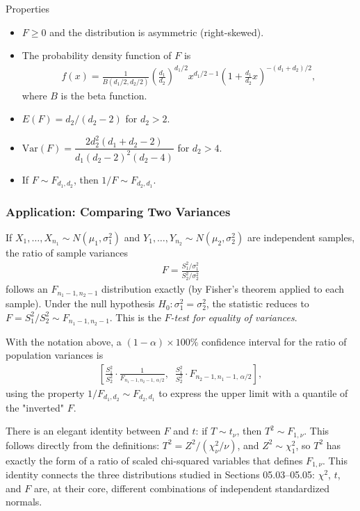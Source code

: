 {Properties}
\begin{itemize}
 \item $F \geq 0$ and the distribution is asymmetric (right-skewed).
 \item The probability density function of $F$ is
 \begin{align}
  \label{eq:3.2.16}
  f(x) = \frac{1}{B(d_1/2, d_2/2)} \left(\frac{d_1}{d_2}\right)^{d_1/2}
  x^{d_1/2 - 1} \left(1 + \frac{d_1}{d_2}x\right)^{-(d_1+d_2)/2},
  \end{align}
  where $B$ is the beta function.
 \item $E(F) = d_2/(d_2 - 2)$ for $d_2 > 2$.
 \item $\text{Var}(F) = \dfrac{2 d_2^2 (d_1 + d_2 - 2)}{d_1 (d_2 - 2)^2 (d_2 - 4)}$ for $d_2 > 4$.
 \item If $F \sim F_{d_1, d_2}$, then $1/F \sim F_{d_2, d_1}$.
\end{itemize}

\subsubsection{Application: Comparing Two Variances}

If $X_1, \ldots, X_{n_1} \sim N(\mu_1, \sigma_1^2)$ and $Y_1, \ldots, Y_{n_2} \sim N(\mu_2, \sigma_2^2)$ are independent samples, the ratio of sample variances
\begin{align}
 \label{eq:3.2.17}
 F = \frac{S_1^2/\sigma_1^2}{S_2^2/\sigma_2^2}
\end{align}
follows an $F_{n_1 - 1, n_2 - 1}$ distribution exactly (by Fisher's theorem applied to each sample). Under the null hypothesis $H_0: \sigma_1^2 = \sigma_2^2$, the statistic reduces to $F = S_1^2/S_2^2 \sim F_{n_1-1, n_2-1}$. This is the \emph{$F$-test for equality of variances}.

\begin{teorema}
 \label{eq:5.5.1}
With the notation above, a $(1-\alpha)\times 100\%$ confidence interval for the ratio of population variances is
\begin{align}
 \left[\frac{S_1^2}{S_2^2}\cdot\frac{1}{F_{n_1-1,n_2-1,\,\alpha/2}},\;\;
 \frac{S_1^2}{S_2^2}\cdot F_{n_2-1,n_1-1,\,\alpha/2}\right],
\end{align}
using the property $1/F_{d_1,d_2} \sim F_{d_2,d_1}$ to express the upper limit with a quantile of the "inverted" $F$.
\end{teorema}

\begin{observacion}
There is an elegant identity between $F$ and $t$: if $T \sim t_\nu$, then $T^2 \sim F_{1,\nu}$. This follows directly from the definitions: $T^2 = Z^2/(\chi^2_\nu/\nu)$, and $Z^2 \sim \chi^2_1$, so $T^2$ has exactly the form of a ratio of scaled chi-squared variables that defines $F_{1,\nu}$. This identity connects the three distributions studied in Sections 05.03--05.05: $\chi^2$, $t$, and $F$ are, at their core, different combinations of independent standardized normals.
\end{observacion}

